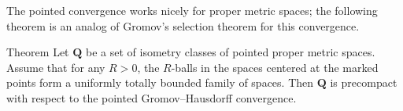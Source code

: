 The pointed convergence works nicely for proper metric spaces;
the following theorem is an analog of Gromov's selection theorem for this convergence.

\begin{thm}{Theorem}\label{thm:pointed-gromov-compactness}%
Let $\bm{Q}$ be a set of isometry classes of pointed proper metric spaces.
Assume that for any $R>0$, the $R$-balls in the spaces centered at the marked points form a uniformly totally bounded family of spaces.
Then $\bm{Q}$ is precompact with respect to the pointed Gromov--Hausdorff convergence. 
\end{thm}
